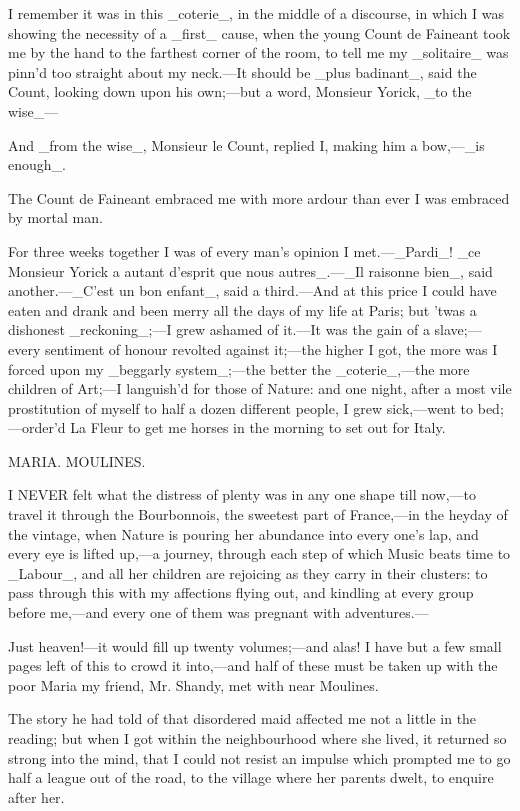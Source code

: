 \documentclass[twoside]{article}
\begin{document}
I remember it was in this _coterie_, in the middle of a discourse, in
which I was showing the necessity of a _first_ cause, when the young
Count de Faineant took me by the hand to the farthest corner of the room,
to tell me my _solitaire_ was pinn’d too straight about my neck.—It
should be _plus badinant_, said the Count, looking down upon his own;—but
a word, Monsieur Yorick, _to the wise_—

And _from the wise_, Monsieur le Count, replied I, making him a bow,—_is
enough_.

The Count de Faineant embraced me with more ardour than ever I was
embraced by mortal man.

For three weeks together I was of every man’s opinion I met.—_Pardi_! _ce
Monsieur Yorick a autant d’esprit que nous autres_.—_Il raisonne bien_,
said another.—_C’est un bon enfant_, said a third.—And at this price I
could have eaten and drank and been merry all the days of my life at
Paris; but ’twas a dishonest _reckoning_;—I grew ashamed of it.—It was
the gain of a slave;—every sentiment of honour revolted against it;—the
higher I got, the more was I forced upon my _beggarly system_;—the better
the _coterie_,—the more children of Art;—I languish’d for those of
Nature: and one night, after a most vile prostitution of myself to half a
dozen different people, I grew sick,—went to bed;—order’d La Fleur to get
me horses in the morning to set out for Italy.




MARIA.
MOULINES.


I NEVER felt what the distress of plenty was in any one shape till
now,—to travel it through the Bourbonnois, the sweetest part of
France,—in the heyday of the vintage, when Nature is pouring her
abundance into every one’s lap, and every eye is lifted up,—a journey,
through each step of which Music beats time to _Labour_, and all her
children are rejoicing as they carry in their clusters: to pass through
this with my affections flying out, and kindling at every group before
me,—and every one of them was pregnant with adventures.—

Just heaven!—it would fill up twenty volumes;—and alas! I have but a few
small pages left of this to crowd it into,—and half of these must be
taken up with the poor Maria my friend, Mr. Shandy, met with near
Moulines.

The story he had told of that disordered maid affected me not a little in
the reading; but when I got within the neighbourhood where she lived, it
returned so strong into the mind, that I could not resist an impulse
which prompted me to go half a league out of the road, to the village
where her parents dwelt, to enquire after her.
\end{document}
